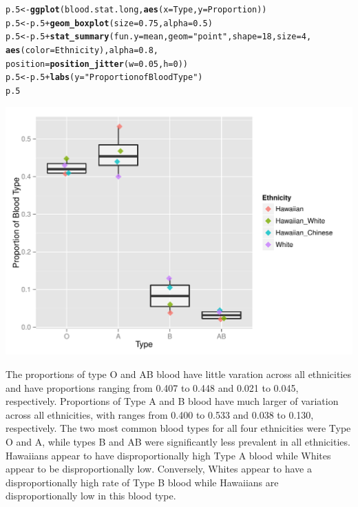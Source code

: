 \documentclass{article}\usepackage[]{graphicx}\usepackage[]{color}
\makeatletter
\def\maxwidth{ %
  \ifdim\Gin@nat@width>\linewidth
    \linewidth
  \else
    \Gin@nat@width
  \fi
}
\newcommand{\hlnum}[1]{\textcolor[rgb]{0.686,0.059,0.569}{#1}}%
\newcommand{\hlstr}[1]{\textcolor[rgb]{0.192,0.494,0.8}{#1}}%
\newcommand{\hlopt}[1]{\textcolor[rgb]{0,0,0}{#1}}%
\newcommand{\hlstd}[1]{\textcolor[rgb]{0.345,0.345,0.345}{#1}}%
\newcommand{\hlkwb}[1]{\textcolor[rgb]{0.69,0.353,0.396}{#1}}%
\newcommand{\hlkwc}[1]{\textcolor[rgb]{0.333,0.667,0.333}{#1}}%
\newcommand{\hlkwd}[1]{\textcolor[rgb]{0.737,0.353,0.396}{\textbf{#1}}}%
\newenvironment{kframe}{%
 \def\at@end@of@kframe{}%
 \ifinner\ifhmode%
  \def\at@end@of@kframe{\end{minipage}}%
  \begin{minipage}{\columnwidth}%
 \fi\fi%
 \def\FrameCommand##1{\hskip\@totalleftmargin \hskip-\fboxsep
 \colorbox{shadecolor}{##1}\hskip-\fboxsep
     \hskip-\linewidth \hskip-\@totalleftmargin \hskip\columnwidth}%
 \MakeFramed {\advance\hsize-\width
   \@totalleftmargin\z@ \linewidth\hsize
   \@setminipage}}%
 {\par\unskip\endMakeFramed%
 \at@end@of@kframe}
\newenvironment{knitrout}{}{} %
\makeatother
\begin{document}
\begin{knitrout}
{}


\begin{kframe}\begin{alltt}
\hlstd{p.5} \hlkwb{<-} \hlkwd{ggplot}\hlstd{(blood.stat.long,} \hlkwd{aes}\hlstd{(}\hlkwc{x} \hlstd{= Type,} \hlkwc{y} \hlstd{= Proportion))}
\hlstd{p.5} \hlkwb{<-} \hlstd{p.5} \hlopt{+} \hlkwd{geom_boxplot}\hlstd{(}\hlkwc{size} \hlstd{=} \hlnum{0.75}\hlstd{,} \hlkwc{alpha} \hlstd{=} \hlnum{0.5}\hlstd{)}
\hlstd{p.5} \hlkwb{<-} \hlstd{p.5} \hlopt{+} \hlkwd{stat_summary}\hlstd{(}\hlkwc{fun.y} \hlstd{= mean,} \hlkwc{geom} \hlstd{=} \hlstr{"point"}\hlstd{,} \hlkwc{shape} \hlstd{=} \hlnum{18}\hlstd{,} \hlkwc{size} \hlstd{=} \hlnum{4}\hlstd{,}
                               \hlkwd{aes}\hlstd{(}\hlkwc{color} \hlstd{= Ethnicity),} \hlkwc{alpha} \hlstd{=} \hlnum{0.8}\hlstd{,}
                          \hlkwc{position} \hlstd{=} \hlkwd{position_jitter}\hlstd{(}\hlkwc{w} \hlstd{=} \hlnum{0.05}\hlstd{,} \hlkwc{h} \hlstd{=} \hlnum{0}\hlstd{))}
\hlstd{p.5} \hlkwb{<-} \hlstd{p.5} \hlopt{+} \hlkwd{labs}\hlstd{(}\hlkwc{y} \hlstd{=} \hlstr{"Proportion of Blood Type"}\hlstd{)}
\hlstd{p.5}
\end{alltt}
\end{kframe}

{\centering \includegraphics[width=\maxwidth]{figure/5_plot-2} 

}



\end{knitrout}

The proportions of type O and AB blood have little varation across all ethnicities and have proportions ranging from 0.407 to 0.448 and 0.021 to 0.045, respectively.  Proportions of Type A and B blood have much larger of variation across all ethnicities, with ranges from 0.400 to 0.533 and 0.038 to 0.130, respectively.  The two most common blood types for all four ethnicities were Type O and A, while types B and AB were significantly less prevalent in all ethnicities.  Hawaiians appear to have disproportionally high Type A blood while Whites appear to be disproportionally low.  Conversely, Whites appear to have a disproportionally high rate of Type B blood while Hawaiians are disproportionally low in this blood type.
\end{document}
